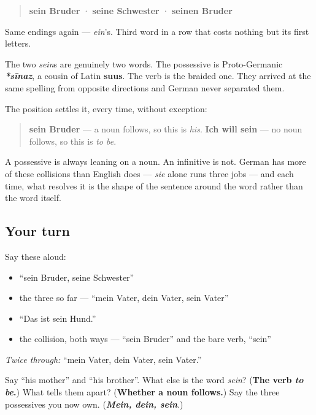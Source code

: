 \begin{quote}
\textbf{sein Bruder} · \textbf{seine Schwester} · \textbf{seinen Bruder}
\end{quote}

Same endings again — \emph{ein}'s. Third word in a row that costs nothing but its first letters.

The two \emph{sein}s are genuinely two words. The possessive is Proto-Germanic \emph{\textbf{*sīnaz}}, a cousin of Latin \textbf{suus}. The verb is the braided one. They arrived at the same spelling from opposite directions and German never separated them.

\begin{grammarlens}[title={Grammar Lens: how a reader tells them apart}]
The position settles it, every time, without exception:

\begin{quote}
\textbf{sein Bruder} — a noun follows, so this is \emph{his}. \textbf{Ich will sein} — no noun follows, so this is \emph{to be}.
\end{quote}

A possessive is always leaning on a noun. An infinitive is not. German has more of these collisions than English does — \emph{sie} alone runs three jobs — and each time, what resolves it is the shape of the sentence around the word rather than the word itself.
\end{grammarlens}

\subsection*{Your turn}
Say these aloud:

\begin{itemize}
\raggedright
  \item \textquotedblleft{}sein Bruder, seine Schwester\textquotedblright{}
  \item the three so far — \textquotedblleft{}mein Vater, dein Vater, sein Vater\textquotedblright{}
  \item \textquotedblleft{}Das ist sein Hund.\textquotedblright{}
  \item the collision, both ways — \textquotedblleft{}sein Bruder\textquotedblright{} and the bare verb, \textquotedblleft{}sein\textquotedblright{}
\end{itemize}

\emph{Twice through:} \textquotedblleft{}mein Vater, dein Vater, sein Vater.\textquotedblright{}

\begin{tcolorbox}[breakable,colback=teal!4,colframe=teal!35!black,title={Before you move on}]
Say \textquotedblleft{}his mother\textquotedblright{} and \textquotedblleft{}his brother\textquotedblright{}. What else is the word \emph{sein}? (\textbf{The verb \emph{to be}.}) What tells them apart? (\textbf{Whether a noun follows.}) Say the three possessives you now own. (\emph{\textbf{Mein, dein, sein}}.)
\end{tcolorbox}

